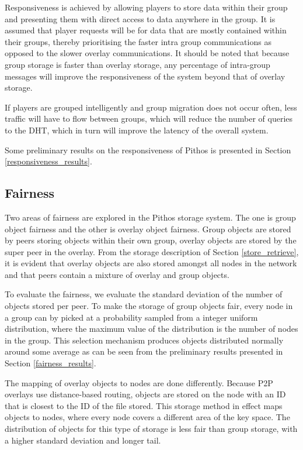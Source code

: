 \documentclass[10pt,a4paper,conference]{IEEEtran}
\begin{document}
Responsiveness is achieved by allowing players to store data within their group and presenting them with direct access to data anywhere in the group.
It is assumed that player requests will be for data that are mostly contained within their groups, thereby prioritising the faster intra group
communications as opposed to the slower overlay communications. It should be noted that because group storage is faster than overlay storage, any
percentage of intra-group messages will improve the responsiveness of the system beyond that of overlay storage.

If players are grouped intelligently and group migration does not occur often, less traffic will have to flow between groups, which will reduce the
number of queries to the DHT, which in turn will improve the latency of the overall system.

Some preliminary results on the responsiveness of Pithos is presented in Section \ref{responsiveness_results}.

\subsection{Fairness}

Two areas of fairness are explored in the Pithos storage system. The one is group object fairness and the other is overlay object fairness. Group
objects are stored by peers storing objects within their own group, overlay objects are stored by the super peer in the overlay. From the storage
description of Section \ref{store_retrieve}, it is evident that overlay objects are also stored amongst all nodes in the network and that peers
contain a mixture of overlay and group objects.

To evaluate the fairness, we evaluate the standard deviation of the number of objects stored per peer. To make the storage of group objects fair,
every node in a group can by picked at a probability sampled from a integer uniform distribution, where the maximum value of the distribution is the
number of nodes in the group. This selection mechanism produces objects distributed normally around some average as can be seen from the preliminary
results presented in Section \ref{fairness_results}.

The mapping of overlay objects to nodes are done differently. Because P2P overlays use distance-based routing, objects are stored on the node with an
ID that is closest to the ID of the file stored. This storage method in effect maps objects to nodes, where every node covers a different area of the
key space. The distribution of objects for this type of storage is less fair than group storage, with a higher standard deviation and longer tail.
\end{document}
